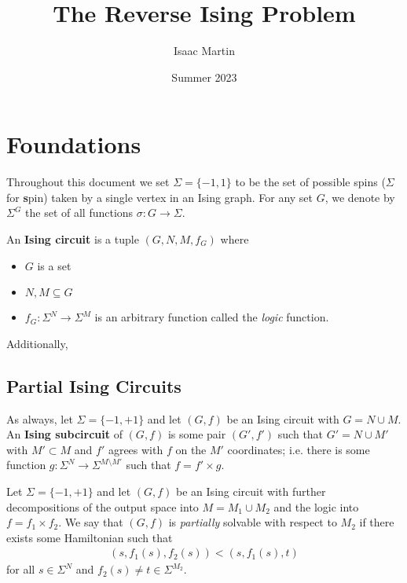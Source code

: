 \documentclass{amsart}
\begin{document}
\newpage
\title{The Reverse Ising Problem}
\author{Isaac Martin}
\date{Summer 2023}
\maketitle
\tableofcontents
\section{Foundations}

Throughout this document we set $\Sigma = \{-1,1\}$ to be the set of possible spins ($\Sigma$ for \textbf{s}pin) taken by a single vertex in an Ising graph. For any set $G$, we denote by $\Sigma^G$ the set of all functions $\sigma: G\to \Sigma$.

\begin{defn}\label{defn:ising-circuit}
  An \textbf{Ising circuit} is a tuple $(G, N, M, f_G)$ where
  \begin{itemize}
    \item $G$ is a set
    \item $N, M \subseteq G$
    \item $f_G: \Sigma^N \to \Sigma^M$ is an arbitrary function called the \emph{logic} function.
  \end{itemize}
  Additionally, 
\end{defn}

\subsection{Partial Ising Circuits}

\begin{defn}\label{defn:ising-subcircuit}
  As always, let $\Sigma = \{-1,+1\}$ and let $(G,f)$ be an Ising circuit with $G = N \cup M$. An \textbf{Ising subcircuit} of $(G,f)$ is some pair $(G', f')$ such that $G' = N\cup M'$ with $M' \subset M$ and $f'$ agrees with $f$ on the $M'$ coordinates; i.e. there is some function $g:\Sigma^N \to \Sigma^{M \setminus M'}$ such that $f = f'\times g$.
\end{defn}

\begin{defn}\label{defn:partial-ising}
  Let $\Sigma = \{-1, +1\}$ and let $(G,f)$ be an Ising circuit with further decompositions of the output space into $M = M_1 \cup M_2$ and the logic into $f = f_1\times f_2$. We say that $(G,f)$ is \emph{partially} solvable with respect to $M_2$ if there exists some Hamiltonian such that
  \begin{align*}
    (s,f_1(s),f_2(s)) < (s,f_1(s),t)
  \end{align*}
  for all $s \in \Sigma^N$ and $f_2(s) \neq t \in \Sigma^{M_2}$.
\end{defn}
\end{document}

